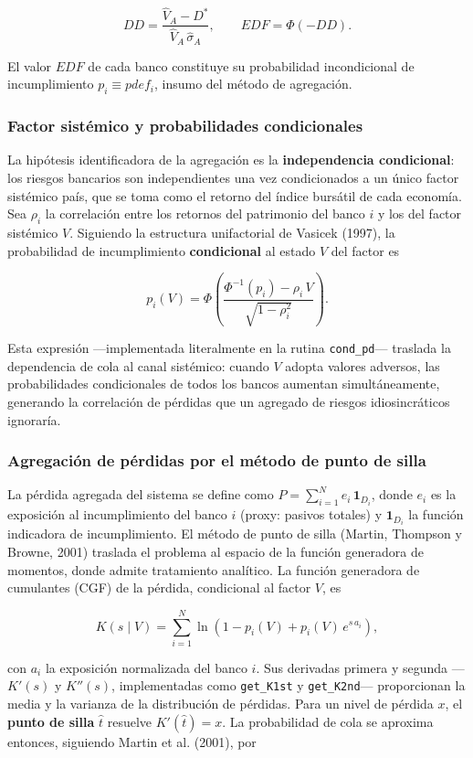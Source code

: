 \documentclass[5p,times,twocolumn,authoryear]{elsarticle}
\begin{document}
\[ DD = \frac{\hat V_A - D^{*}}{\hat V_A\,\hat\sigma_A}, \qquad EDF = \Phi(-DD). \]

El valor $EDF$ de cada banco constituye su probabilidad incondicional de incumplimiento $p_i \equiv pdef_i$, insumo del método de agregación.

\subsubsection{Factor sistémico y probabilidades condicionales}

La hipótesis identificadora de la agregación es la \textbf{independencia condicional}: los riesgos bancarios son independientes una vez condicionados a un único factor sistémico país, que se toma como el retorno del índice bursátil de cada economía. Sea $\rho_i$ la correlación entre los retornos del patrimonio del banco $i$ y los del factor sistémico $V$. Siguiendo la estructura unifactorial de Vasicek (1997), la probabilidad de incumplimiento \textbf{condicional} al estado $V$ del factor es

\[ p_i(V) = \Phi\!\left(\frac{\Phi^{-1}(p_i) - \rho_i\,V}{\sqrt{1-\rho_i^{2}}}\right). \]

Esta expresión —implementada literalmente en la rutina \texttt{cond\_pd}— traslada la dependencia de cola al canal sistémico: cuando $V$ adopta valores adversos, las probabilidades condicionales de todos los bancos aumentan simultáneamente, generando la correlación de pérdidas que un agregado de riesgos idiosincráticos ignoraría.

\subsubsection{Agregación de pérdidas por el método de punto de silla}

La pérdida agregada del sistema se define como $P = \sum_{i=1}^{N} e_i\,\mathbf{1}_{D_i}$, donde $e_i$ es la exposición al incumplimiento del banco $i$ (proxy: pasivos totales) y $\mathbf{1}_{D_i}$ la función indicadora de incumplimiento. El método de punto de silla (Martin, Thompson y Browne, 2001) traslada el problema al espacio de la función generadora de momentos, donde admite tratamiento analítico. La función generadora de cumulantes (CGF) de la pérdida, condicional al factor $V$, es

\[ K(s\mid V) = \sum_{i=1}^{N} \ln\!\left(1 - p_i(V) + p_i(V)\,e^{s\,a_i}\right), \]

con $a_i$ la exposición normalizada del banco $i$. Sus derivadas primera y segunda —$K'(s)$ y $K''(s)$, implementadas como \texttt{get\_K1st} y \texttt{get\_K2nd}— proporcionan la media y la varianza de la distribución de pérdidas. Para un nivel de pérdida $x$, el \textbf{punto de silla} $\hat t$ resuelve $K'(\hat t) = x$. La probabilidad de cola se aproxima entonces, siguiendo Martin et al. (2001), por
\end{document}
